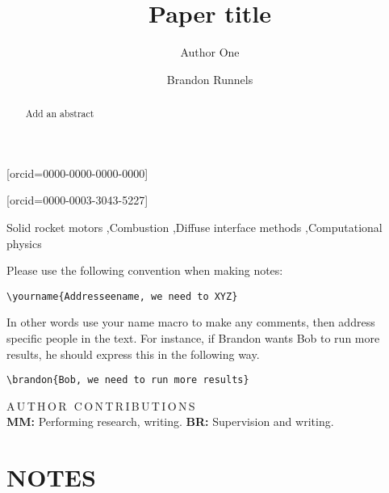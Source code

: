 \documentclass[]{cas-sc}
\def\usetodonotes{} %
\newcommand{\brandon}[1]{\todo[color=C0!10,linecolor=C0,bordercolor=C0]{BR: #1}}
\begin{document}
\ifdefined\usetodonotes
\setcounter{page}{0}
\listoftodos
\fi


\title [mode = title]{Paper title}  
\author[uccs]{Author One}[orcid=0000-0000-0000-0000]%
\author[isu,uccs]{Brandon Runnels}[orcid=0000-0003-3043-5227]%
\cormark[1]


\begin{abstract}
    Add an abstract
\end{abstract}

\begin{keywords}
 Solid rocket motors \sep Combustion \sep Diffuse interface methods \sep Computational physics
\end{keywords}


\ifdefined\usetodonotes
\begin{tcolorbox}[title={\bf Todonote convention}]
  Please use the following convention when making notes:
  \begin{center}\verb-\yourname{Addresseename, we need to XYZ}-\end{center}
  In other words use your name macro to make any comments, then address specific people in the text.
  For instance, if Brandon wants Bob to run more results, he should express this in the following way.
  \begin{center}
    \verb-\brandon{Bob, we need to run more results}-
  \end{center}
\end{tcolorbox}
\listoftodos
 
\setcounter{page}{0}
\fi


\maketitle

\vspace{10pt}\noindent A\,U\,T\,H\,O\,R\, \,C\,O\,N\,T\,R\,I\,B\,U\,T\,I\,O\,N\,S \\
{\bf MM:} Performing research, writing.
{\bf BR:} Supervision and writing.

\section{NOTES}
\end{document}
